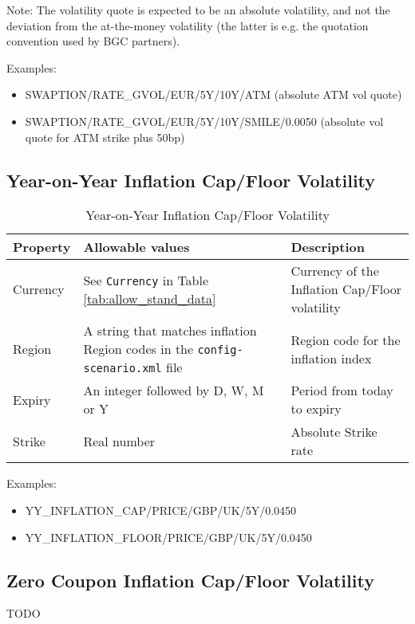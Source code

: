\medskip
Note: The volatility quote is expected to be an absolute volatility, and not the deviation from the at-the-money volatility (the latter is e.g. the quotation convention used by BGC partners).

\medskip
Examples:
\begin{itemize}
\item { SWAPTION/RATE\_GVOL/EUR/5Y/10Y/ATM} (absolute ATM vol quote) 
\item { SWAPTION/RATE\_GVOL/EUR/5Y/10Y/SMILE/0.0050} (absolute vol quote for ATM strike plus 50bp)
\end{itemize}

\subsection{Year-on-Year Inflation Cap/Floor Volatility} \label{ss:yoy_inflation_vol}

\begin{table}[H]
\centering
\begin{tabular}{|p{3cm}|p{5cm}|p{7cm}|}
\hline
{\bf Property} & {\bf Allowable values} & {\bf Description} \\
\hline
Currency & See \lstinline!Currency! in Table \ref{tab:allow_stand_data}&  Currency of the Inflation Cap/Floor volatility\\ \hline
Region & A string that matches inflation Region codes in the {\tt config-scenario.xml} file & Region code for the inflation index\\  \hline
Expiry & An integer followed by D, W, M or Y & Period from today to expiry \\ \hline
Strike & Real number & Absolute Strike rate\\ 
\hline
\end{tabular}
  \caption{Year-on-Year Inflation Cap/Floor Volatility}
  \label{tab:yoyinflvol_quote}
\end{table}

Examples: 
\begin{itemize}
\item YY\_INFLATION\_CAP/PRICE/GBP/UK/5Y/0.0450
\item YY\_INFLATION\_FLOOR/PRICE/GBP/UK/5Y/0.0450
\end{itemize}

\subsection{Zero Coupon Inflation Cap/Floor Volatility} \label{ss:zc_inflation_vol}

TODO
